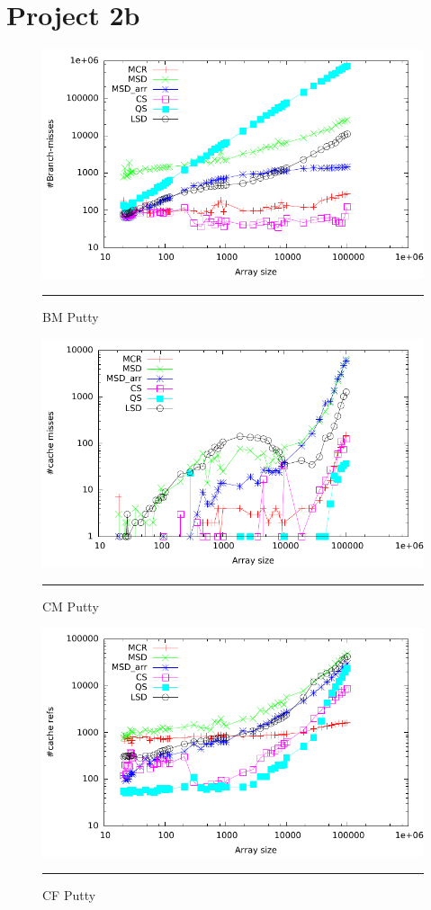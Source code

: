 \section{Project 2b}
\begin{figure}[htbp]
	\centering
		\includegraphics[width=\textwidth]{./Appendices/Figures/Project2b/Branch_misses.pdf}
		\rule{35em}{0.5pt}
	\caption[Branch misses]{
	BM Putty
	}
	\label{fig:Branch_misses_p2bputty}
\end{figure}
\begin{figure}[htbp]
	\centering
		\includegraphics[width=\textwidth]{./Appendices/Figures/Project2b/Cache_misses.pdf}
		\rule{35em}{0.5pt}
	\caption[Cache misses]{
	CM Putty
	}
	\label{fig:Cache_misses_p2b_putty}
\end{figure}
\begin{figure}[htbp]
	\centering
		\includegraphics[width=\textwidth]{./Appendices/Figures/Project2b/Cache_refs.pdf}
		\rule{35em}{0.5pt}
	\caption[Cache refs]{
	CF Putty
	}
	\label{fig:Cache_refs_p2b_putty}
\end{figure}
